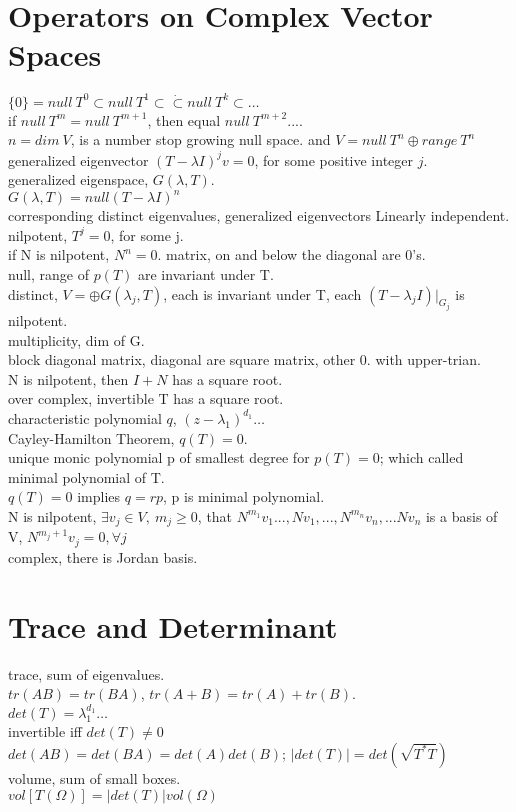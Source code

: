 \documentclass[paper=a4, fontsize=11pt]{scrartcl} %
\numberwithin{equation}{section} %
\numberwithin{figure}{section} %
\numberwithin{table}{section} %
\begin{document}
\section{Operators on Complex Vector Spaces}
$\{0\}=null\ T^0\subset null\ T^1\subset\dot\subset null\ T^k\subset\dots$\\
if $null\ T^m=null\ T^{m+1}$, then equal $null\ T^{m+2}...$.\\
$n=dim\ V$, is a number stop growing null space. and $V=null\ T^n \oplus range\ T^n$\\
generalized eigenvector $(T-\lambda I)^j v=0$, for some positive integer $j$.\\
generalized eigenspace, $G(\lambda,T)$.\\
$G(\lambda,T) = null(T-\lambda I)^n$\\
corresponding distinct eigenvalues, generalized eigenvectors Linearly independent.\\
nilpotent, $T^j=0$, for some j.\\
if N is nilpotent, $N^n=0$. matrix,  on and below the diagonal are 0's.\\
null, range of $p(T)$ are invariant under T.\\
distinct, $V=\oplus G(\lambda_j, T)$, each is invariant under T, each $(T-\lambda_j I)|_{G_j}$ is nilpotent.\\
multiplicity, dim of G.\\
block diagonal matrix, diagonal are square matrix, other 0. with upper-trian.\\
N is nilpotent, then $I+N$ has a square root.\\
over complex, invertible T has a square root.\\
characteristic polynomial $q$, $(z-\lambda_1)^{d_1}\dots$\\
Cayley-Hamilton Theorem, $q(T) =0$.\\
unique monic polynomial p of smallest degree for $p(T)=0$; which called minimal polynomial of T.\\
$q(T)=0$ implies $q=rp$, p is minimal polynomial.\\
N is nilpotent, $\exists v_j\in V,\ m_j\geq 0$, that $N^{m_1}v_1...,Nv_1,...,N^{m_n}v_n,...Nv_n$ is a basis of V, $N^{m_j +1}v_j=0,\forall j$\\
complex, there is Jordan basis.\\

\section{Trace and Determinant}
trace, sum of eigenvalues.\\
$tr(AB)=tr(BA)$, $tr(A+B)=tr(A)+tr(B)$.\\
$det(T)= \lambda_1^{d_1}\dots$\\
invertible iff $det(T)\neq 0$\\
$det(AB)=det(BA)=det(A)det(B)$; $|det(T)|=det(\sqrt{T^*T})$\\
volume, sum of small boxes.\\
$vol[T(\Omega)] = |det(T)|vol(\Omega)$
\end{document}
